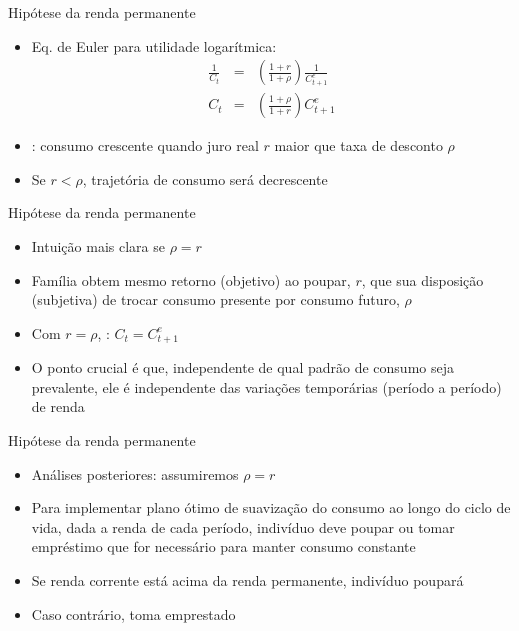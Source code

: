 \documentclass[10pt]{beamer}
\begin{document}
\begin{frame}
    {Hipótese da renda permanente}
    \begin{itemize}
        \item Eq. de Euler para utilidade logarítmica:
        \begin{eqnarray}
            \frac{1}{C_t} &=& \left(\frac{1 + r}{1 + \rho}\right) \frac{1}{C_{t+1}^e} \nonumber \\
            C_t &=& \left(\frac{1 + \rho}{1 + r}\right)C_{t+1}^e\label{aula7_eq7}
        \end{eqnarray}
        \item {}: consumo crescente quando juro real $r$ maior que taxa de desconto $\rho$\bigskip        
        \item Se $r < \rho$, trajetória de consumo será decrescente
    \end{itemize}
\end{frame}

\begin{frame}
    {Hipótese da renda permanente}
    \begin{itemize}
        \item Intuição mais clara se $\rho = r$\bigskip
        \item Família obtem mesmo retorno (objetivo) ao poupar, $r$, que sua disposição (subjetiva) de trocar consumo presente por consumo futuro, $\rho$\bigskip
        \item Com $r = \rho$, : $C_t = C_{t+1}^e$\bigskip
        \item O ponto crucial é que, independente de qual padrão de consumo seja prevalente, ele é independente das variações temporárias (período a período) de renda
    \end{itemize}
\end{frame}

\begin{frame}
    {Hipótese da renda permanente}
    \begin{itemize}
        \item Análises posteriores: assumiremos $\rho = r$\bigskip
        \item Para implementar plano ótimo de suavização do consumo ao longo do ciclo de vida, dada a renda de cada período, indivíduo deve poupar ou tomar empréstimo que for necessário para manter consumo constante\bigskip
        \item Se renda corrente está acima da renda permanente, indivíduo poupará\bigskip
        \item Caso contrário, toma emprestado
    \end{itemize}
\end{frame}
\end{document}

